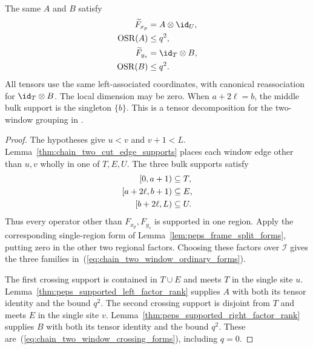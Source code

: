 \begin{lemma}
\begin{align}
        \label{eq:chain_two_window_ordinary_forms}
    \end{align}
    The same $A$ and $B$ satisfy
    \begin{align}
        \widetilde F_{x_p}    & =A\otimes\id_U,\notag  \\
        \operatorname{OSR}(A) & \le q^2,\notag         \\
        \widetilde F_{y_s}    & =\id_T\otimes B,\notag \\
        \operatorname{OSR}(B) & \le q^2.
        \label{eq:chain_two_window_crossing_forms}
    \end{align}
    All tensors use the same left-associated coordinates, with canonical
    reassociation for $\id_T\otimes B$. The local dimension may be zero.
    When $a+2\ell=b$, the middle bulk support is the singleton $\{b\}$.
    This is a tensor decomposition for the two-window grouping in
    \cite[Sections~4.1 and~5.2]{Arad2016RigorousRG}.
\end{lemma}
\begin{proof}\leanok
    The hypotheses give $u<v$ and $v+1<L$.
    Lemma~\ref{thm:chain_two_cut_edge_supports} places each window edge
    other than $u,v$ wholly in one of $T,E,U$.
    The three bulk supports satisfy
    \begin{align}
        {[0,a+1)}       & \subseteq T,\notag \\
        {[a+2\ell,b+1)} & \subseteq E,\notag \\
        {[b+2\ell,L)}   & \subseteq U.
        \label{eq:chain_two_window_bulk_containments}
    \end{align}
    Thus every operator other than $F_{x_p},F_{y_s}$ is supported in one
    region. Apply the corresponding single-region form of
    Lemma~\ref{lem:peps_frame_split_forms}, putting zero in the other two
    regional factors. Choosing these factors over $\mathcal I$ gives the
    three families in~(\ref{eq:chain_two_window_ordinary_forms}).

    The first crossing support is contained in $T\cup E$ and meets $T$
    in the single site $u$. Lemma~\ref{thm:peps_supported_left_factor_rank}
    supplies $A$ with both its tensor identity and the bound $q^2$.
    The second crossing support is disjoint from $T$ and meets $E$ in
    the single site $v$. Lemma~\ref{thm:peps_supported_right_factor_rank}
    supplies $B$ with both its tensor identity and the bound $q^2$.
    These are~(\ref{eq:chain_two_window_crossing_forms}), including $q=0$.
\end{proof}

